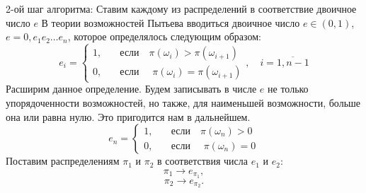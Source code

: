 \documentclass[russian, unicode, mathserif, aspectratio=169]{beamer}
\begin{document}
\begin{frame}{2-ой шаг алгоритма: Ставим каждому из распределений в соответствие двоичное число $e$}
    В теории возможностей Пытьева вводиться двоичное число $e \in (0,1)$, $e=0,e_1e_2\ldots e_n$,
которое определялось следующим образом:
\begin{equation}
    e_i =
      \begin{cases}
        1,    & \quad \text{если} \quad \pi(\omega_i) > \pi(\omega_{i+1})\\
        0,  & \quad \text{если } \quad \pi(\omega_i) = \pi(\omega_{i+1})
      \end{cases},\quad i = \overline{1, n-1}
\end{equation}
Расширим данное определение. Будем записывать в числе $e$ не только упорядоченности возможностей, но также, для наименьшей возможности, больше она или равна нулю. Это пригодится нам в дальнейшем.
\begin{equation}
    e_n =
      \begin{cases}
        1,    & \quad \text{если} \quad \pi(\omega_n) > 0\\
        0,  & \quad \text{если } \quad \pi(\omega_n) = 0
      \end{cases}
\end{equation}
Поставим распределениям $\pi_1$ и $\pi_2$ в соответствия числа $e_1$ и $e_2$:
$$\pi_1 \rightarrow e_{\pi_1},$$
$$\pi_2 \rightarrow e_{\pi_2}.$$
\end{frame}
\end{document}
